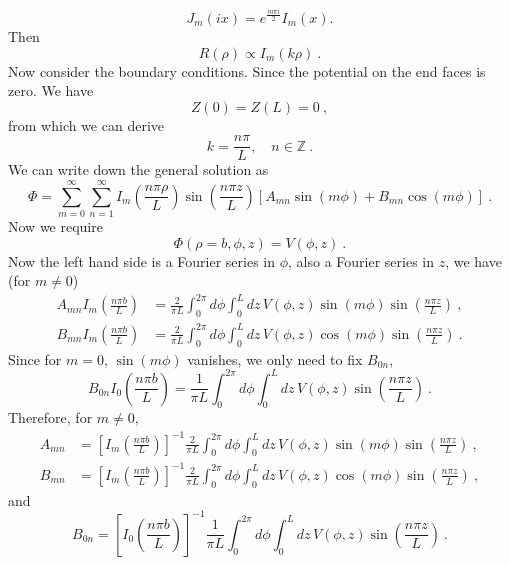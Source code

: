 \documentclass[12pt]{article}
\begin{document}
\begin{equation}
    J_m(ix) = e^{\frac{m\pi i}{2}} I_m(x).
\end{equation}
Then
\begin{equation}
    R(\rho) \propto I_m(k \rho)~.
\end{equation}
Now consider the boundary conditions. Since the potential on the end faces is zero. We have
\begin{equation}
    Z(0) = Z(L) = 0~,
\end{equation}
from which we can derive
\begin{equation}
    k = \frac{n \pi}{L}, \quad n \in \mathbb Z~.
\end{equation}
We can write down the general solution as
\begin{equation}
    \Phi = \sum_{m=0}^\infty \sum_{n=1}^\infty I_m\left(\frac{n\pi \rho}{L}\right) \sin\left(\frac{n \pi z}{L}\right)\left[A_{mn} \sin(m \phi) + B_{mn} \cos(m \phi)\right]~.
\end{equation}
Now we require
\begin{equation}
    \Phi(\rho = b, \phi, z) = V(\phi, z)~.
\end{equation}
Now the left hand side is a Fourier series in $\phi$, also a Fourier series in $z$, we have (for $m \neq 0$)
\begin{align}
    A_{mn} I_m\left(\frac{n \pi b}{L}\right) &= \frac{2}{\pi L} \int_0^{2\pi} d\phi \int_0^L dz \,V(\phi,z) \sin(m \phi) \sin\left(\frac{n \pi z}{L}\right)~,\\
    B_{mn} I_m\left(\frac{n \pi b}{L}\right) &= \frac{2}{\pi L} \int_0^{2\pi} d\phi \int_0^L dz \,V(\phi,z) \cos(m \phi) \sin\left(\frac{n \pi z}{L}\right)~.
\end{align}
Since for $m = 0$, $\sin(m \phi)$ vanishes, we only need to fix $B_{0n}$,
\begin{equation}
    B_{0n} I_0\left(\frac{n \pi b}{L}\right) = \frac{1}{\pi L}\int_0^{2\pi} d\phi \int_0^L dz \,V(\phi,z) \sin\left(\frac{n \pi z}{L}\right)~.
\end{equation}
Therefore, for $m \neq 0$,
\begin{align}
    A_{mn} &= \left[I_m\left(\frac{n \pi b}{L}\right)\right]^{-1}\frac{2}{\pi L} \int_0^{2\pi} d\phi \int_0^L dz \,V(\phi,z) \sin(m \phi) \sin\left(\frac{n \pi z}{L}\right)~,\\
    B_{mn} &= \left[I_m\left(\frac{n \pi b}{L}\right)\right]^{-1}\frac{2}{\pi L} \int_0^{2\pi} d\phi \int_0^L dz \,V(\phi,z) \cos(m \phi) \sin\left(\frac{n \pi z}{L}\right)~,
\end{align}
and
\begin{equation}
    B_{0n} = \left[I_0\left(\frac{n \pi b}{L}\right)\right]^{-1}\frac{1}{\pi L}\int_0^{2\pi} d\phi \int_0^L dz \,V(\phi,z) \sin\left(\frac{n \pi z}{L}\right)~.
\end{equation}
\end{document}
